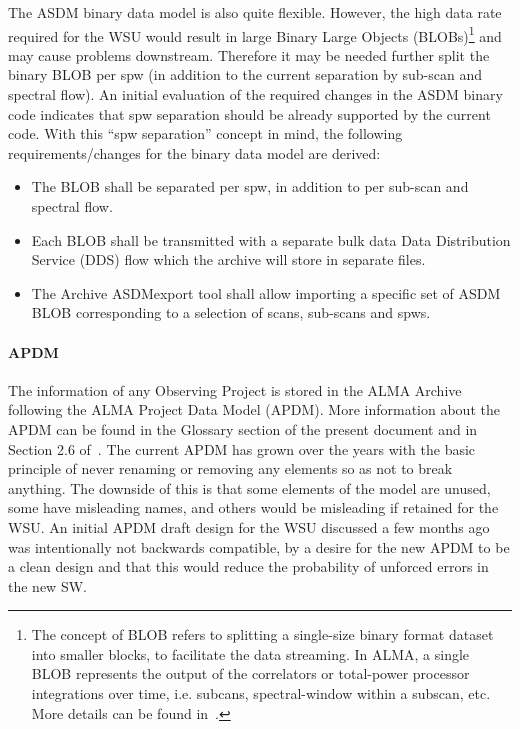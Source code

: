 The ASDM binary data model is also quite flexible.
However, the high data rate required for the WSU would result in large Binary Large Objects (BLOBs)\footnote{The concept of BLOB  refers to splitting  a single-size binary format dataset into smaller blocks, to facilitate the data streaming. In ALMA, a single BLOB represents the output of the correlators or total-power processor integrations over time, i.e. subcans, spectral-window within a subscan, etc. More details can be found in~\cite{Pokorny2009}.} and may cause problems downstream.
Therefore it may be needed further split the binary BLOB per spw (in addition to the current separation by sub-scan and spectral flow).
An initial evaluation of the required changes in the ASDM binary code indicates that spw separation should be already supported by the current code. With this ``spw separation'' concept in mind, the following requirements/changes for the binary data model are derived:
\begin{itemize}
\setlength\itemsep{-0.5em}
\item The BLOB shall be separated per spw, in addition to per sub-scan and spectral flow.
\item Each BLOB shall be transmitted with a separate bulk data Data Distribution Service (DDS) flow which the archive will store in separate files.
\item The Archive ASDMexport tool shall allow importing a specific set of ASDM BLOB corresponding to a selection of scans, sub-scans and spws.
\end{itemize}
   

\paragraph{APDM}
The information of any Observing Project is stored in the
ALMA Archive following the ALMA Project Data Model (APDM). More information about the APDM can be found in the Glossary section of the present document and in Section 2.6 of~\cite{CSA-IA}. The current APDM has grown over the years with the basic principle of never renaming or removing any elements so as not to break anything. The downside of this is that some elements of the model are unused, some have misleading names, and others would be misleading if retained for the WSU. An initial APDM draft design for the WSU discussed a few months ago was intentionally not backwards compatible, by a desire for the new APDM to be a clean design and that this would reduce the probability of unforced errors in the new SW.

